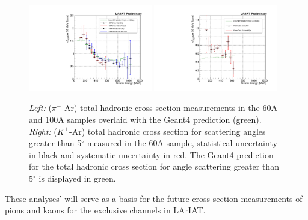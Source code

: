 \begin{figure}[htb]
\centering
\includegraphics[width=0.48\textwidth]{Chapter-6/Images/TheMoneyPlot.pdf}
\includegraphics[width=0.48\textwidth]{Chapter-7/Images/TheMoneyPlotK.pdf}
\caption{\emph{Left:} ($\pi^-$-Ar) total hadronic cross section measurements in the 60A and 100A samples overlaid with the  Geant4 prediction (green). \emph{Right:} ($K^+$-Ar) total hadronic cross section for  scattering angles greater than 5$^\circ$ measured in the 60A sample, statistical uncertainty in black and systematic uncertainty in red. The Geant4 prediction for the total hadronic cross section for angle scattering greater than 5$^\circ$ is displayed in green. } 
\label{fig:finalfinal}
\end{figure}


These analyses' will serve as a basis for the future cross section measurements of pions and kaons for the exclusive channels in LArIAT.

